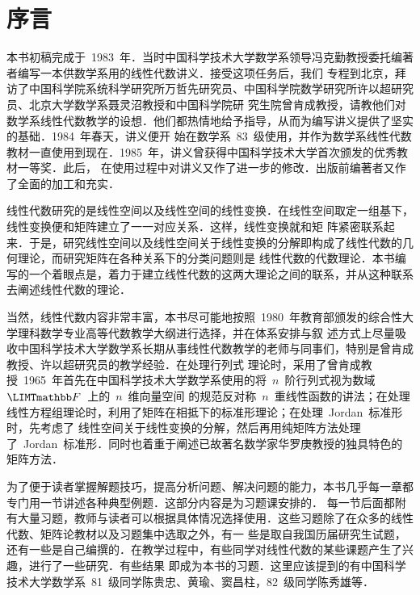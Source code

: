 

\chapter{序\hspace{\ccwd}言}

\begin{fzliukai}
\TeXGyreBonum\boldmath
\setlength\parskip{\baselineskip-\ccwd}
本书初稿完成于~1983~年．当时中国科学技术大学数学系领导冯克勤教授委托编著者编写一本供数学系用的线性代数讲义．接受这项任务后，我们
专程到北京，拜访了中国科学院系统科学研究所万哲先研究员、中国科学院数学研究所许以超研究员、北京大学数学系聂灵沼教授和中国科学院研
究生院曾肯成教授，请教他们对数学系线性代数教学的设想．他们都热情地给予指导，从而为编写讲义提供了坚实的基础．1984~年春天，讲义便开
始在数学系~83~级使用，并作为数学系线性代数教材一直使用到现在．1985~年，讲义曾获得中国科学技术大学首次颁发的优秀教材一等奖．此后，
在使用过程中对讲义又作了进一步的修改．出版前编著者又作了全面的加工和充实．

线性代数研究的是线性空间以及线性空间的线性变换．在线性空间取定一组基下，线性变换便和矩阵建立了一一对应关系．这样，线性变换就和矩
阵紧密联系起来．于是，研究线性空间以及线性空间关于线性变换的分解即构成了线性代数的几何理论，而研究矩阵在各种关系下的分类问题则是
线性代数的代数理论．本书编写的一个着眼点是，着力于建立线性代数的这两大理论之间的联系，并从这种联系去阐述线性代数的理论．

当然，线性代数内容非常丰富，本书尽可能地按照~1980~年教育部颁发的综合性大学理科数学专业高等代数教学大纲进行选择，并在体系安排与叙
述方式上尽量吸收中国科学技术大学数学系长期从事线性代数教学的老师与同事们，特别是曾肯成教授、许以超研究员的教学经验．在处理行列式
理论时，采用了曾肯成教授~1965~年首先在中国科学技术大学数学系使用的将~$n$~阶行列式视为数域~$\mF$~上的~$n$~维向量空间
的规范反对称~$n$~重线性函数的讲法；在处理线性方程组理论时，利用了矩阵在相抵下的标准形理论；在处理~Jordan~标准形时，先考虑了
线性空间关于线性变换的分解，然后再用纯矩阵方法处理了~Jordan~标准形．同时也着重于阐述已故著名数学家华罗庚教授的独具特色的矩阵方法．

为了便于读者掌握解题技巧，提高分析问题、解决问题的能力，本书几乎每一章都专门用一节讲述各种典型例题．这部分内容是为习题课安排的．
每一节后面都附有大量习题，教师与读者可以根据具体情况选择使用．这些习题除了在众多的线性代数、矩阵论教材以及习题集中选取之外，有一
些是取自我国历届研究生试题，还有一些是自己编撰的．在教学过程中，有些同学对线性代数的某些课题产生了兴趣，进行了一些研究．有些结果
即成为本书的习题．这里应该提到的有中国科学技术大学数学系~81~级同学陈贵忠、黄瑜、窦昌柱，82~级同学陈秀雄等．


\end{fzliukai}
